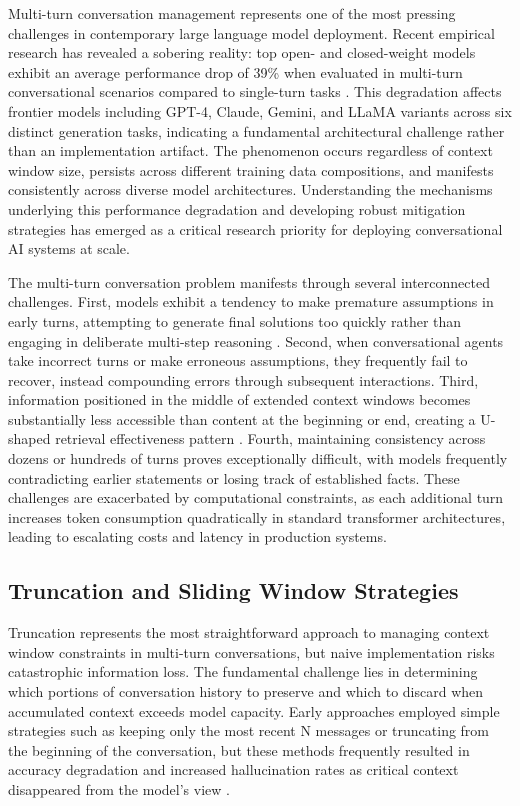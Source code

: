 \documentclass[11pt,letterpaper]{article}
\begin{document}
Multi-turn conversation management represents one of the most pressing challenges in contemporary large language model deployment. Recent empirical research has revealed a sobering reality: top open- and closed-weight models exhibit an average performance drop of 39\% when evaluated in multi-turn conversational scenarios compared to single-turn tasks \cite{wang2025survey}. This degradation affects frontier models including GPT-4, Claude, Gemini, and LLaMA variants across six distinct generation tasks, indicating a fundamental architectural challenge rather than an implementation artifact. The phenomenon occurs regardless of context window size, persists across different training data compositions, and manifests consistently across diverse model architectures. Understanding the mechanisms underlying this performance degradation and developing robust mitigation strategies has emerged as a critical research priority for deploying conversational AI systems at scale.

The multi-turn conversation problem manifests through several interconnected challenges. First, models exhibit a tendency to make premature assumptions in early turns, attempting to generate final solutions too quickly rather than engaging in deliberate multi-step reasoning \cite{wang2025survey}. Second, when conversational agents take incorrect turns or make erroneous assumptions, they frequently fail to recover, instead compounding errors through subsequent interactions. Third, information positioned in the middle of extended context windows becomes substantially less accessible than content at the beginning or end, creating a U-shaped retrieval effectiveness pattern \cite{liu2024lost}. Fourth, maintaining consistency across dozens or hundreds of turns proves exceptionally difficult, with models frequently contradicting earlier statements or losing track of established facts. These challenges are exacerbated by computational constraints, as each additional turn increases token consumption quadratically in standard transformer architectures, leading to escalating costs and latency in production systems.

\subsection{Truncation and Sliding Window Strategies}

Truncation represents the most straightforward approach to managing context window constraints in multi-turn conversations, but naive implementation risks catastrophic information loss. The fundamental challenge lies in determining which portions of conversation history to preserve and which to discard when accumulated context exceeds model capacity. Early approaches employed simple strategies such as keeping only the most recent N messages or truncating from the beginning of the conversation, but these methods frequently resulted in accuracy degradation and increased hallucination rates as critical context disappeared from the model's view \cite{greyling2024context}.
\end{document}
